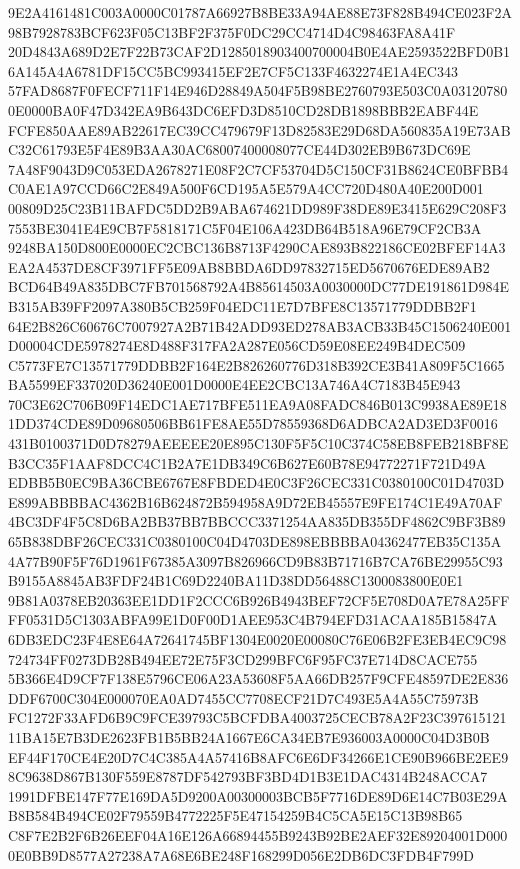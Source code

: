 \documentclass[UTF8,fontset=fandol,zihao=-4,a4paper]{ctexart}
\begin{document}
{{9E2A4161481C003A0000C01787A66927B8BE33A94AE88E73F828B494CE023F2A98B7928783BCF623F05C13BF2F375F0DC29CC4714D4C98463FA8A41F
20D4843A689D2E7F22B73CAF2D1285018903400700004B0E4AE2593522BFD0B16A145A4A6781DF15CC5BC993415EF2E7CF5C133F4632274E1A4EC343
57FAD8687F0FECF711F14E946D28849A504F5B98BE2760793E503C0A031207800E0000BA0F47D342EA9B643DC6EFD3D8510CD28DB1898BBB2EABF44E
FCFE850AAE89AB22617EC39CC479679F13D82583E29D68DA560835A19E73ABC32C61793E5F4E89B3AA30AC68007400008077CE44D302EB9B673DC69E
7A48F9043D9C053EDA2678271E08F2C7CF53704D5C150CF31B8624CE0BFBB4C0AE1A97CCD66C2E849A500F6CD195A5E579A4CC720D480A40E200D001
00809D25C23B11BAFDC5DD2B9ABA674621DD989F38DE89E3415E629C208F37553BE3041E4E9CB7F5818171C5F04E106A423DB64B518A96E79CF2CB3A
9248BA150D800E0000EC2CBC136B8713F4290CAE893B822186CE02BFEF14A3EA2A4537DE8CF3971FF5E09AB8BBDA6DD97832715ED5670676EDE89AB2
BCD64B49A835DBC7FB701568792A4B85614503A0030000DC77DE191861D984EB315AB39FF2097A380B5CB259F04EDC11E7D7BFE8C13571779DDBB2F1
64E2B826C60676C7007927A2B71B42ADD93ED278AB3ACB33B45C1506240E001D00004CDE5978274E8D488F317FA2A287E056CD59E08EE249B4DEC509
C5773FE7C13571779DDBB2F164E2B826260776D318B392CE3B41A809F5C1665BA5599EF337020D36240E001D0000E4EE2CBC13A746A4C7183B45E943
70C3E62C706B09F14EDC1AE717BFE511EA9A08FADC846B013C9938AE89E181DD374CDE89D09680506BB61FE8AE55D78559368D6ADBCA2AD3ED3F0016
431B0100371D0D78279AEEEEE20E895C130F5F5C10C374C58EB8FEB218BF8EB3CC35F1AAF8DCC4C1B2A7E1DB349C6B627E60B78E94772271F721D49A
EDBB5B0EC9BA36CBE6767E8FBDED4E0C3F26CEC331C0380100C01D4703DE899ABBBBAC4362B16B624872B594958A9D72EB45557E9FE174C1E49A70AF
4BC3DF4F5C8D6BA2BB37BB7BBCCC3371254AA835DB355DF4862C9BF3B8965B838DBF26CEC331C0380100C04D4703DE898EBBBBA04362477EB35C135A
4A77B90F5F76D1961F67385A3097B826966CD9B83B71716B7CA76BE29955C93B9155A8845AB3FDF24B1C69D2240BA11D38DD56488C1300083800E0E1
9B81A0378EB20363EE1DD1F2CCC6B926B4943BEF72CF5E708D0A7E78A25FFFF0531D5C1303ABFA99E1D0F00D1AEE953C4B794EFD31ACAA185B15847A
6DB3EDC23F4E8E64A72641745BF1304E0020E00080C76E06B2FE3EB4EC9C98724734FF0273DB28B494EE72E75F3CD299BFC6F95FC37E714D8CACE755
5B366E4D9CF7F138E5796CE06A23A53608F5AA66DB257F9CFE48597DE2E836DDF6700C304E000070EA0AD7455CC7708ECF21D7C493E5A4A55C75973B
FC1272F33AFD6B9C9FCE39793C5BCFDBA4003725CECB78A2F23C39761512111BA15E7B3DE2623FB1B5BB24A1667E6CA34EB7E936003A0000C04D3B0B
EF44F170CE4E20D7C4C385A4A57416B8AFC6E6DF34266E1CE90B966BE2EE98C9638D867B130F559E8787DF542793BF3BD4D1B3E1DAC4314B248ACCA7
1991DFBE147F77E169DA5D9200A00300003BCB5F7716DE89D6E14C7B03E29AB8B584B494CE02F79559B4772225F5E47154259B4C5CA5E15C13B98B65
C8F7E2B2F6B26EEF04A16E126A66894455B9243B92BE2AEF32E89204001D0000E0BB9D8577A27238A7A68E6BE248F168299D056E2DB6DC3FDB4F799D
}}
\end{document}
